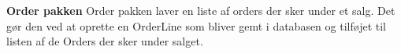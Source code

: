 \textbf{Order pakken}\newline
Order pakken laver en liste af orders der sker under et salg. Det gør den ved at oprette en OrderLine som bliver gemt i databasen og tilføjet til listen af de Orders der sker under salget. 
